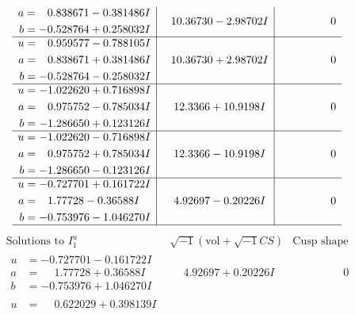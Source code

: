 \documentclass[1p]{elsarticle_modified}
\theoremstyle{definition}
\newcommand{\I}{\sqrt{-1}}
\begin{document}
$$\begin{array}{c|c|c}
\begin{aligned}
a &= \phantom{-}0.838671 - 0.381486 I \\
b &= -0.528764 + 0.258032 I\end{aligned}
 & \phantom{-}10.36730 - 2.98702 I & \phantom{-0.000000 } 0 \\ \hline\begin{aligned}
u &= \phantom{-}0.959577 - 0.788105 I \\
a &= \phantom{-}0.838671 + 0.381486 I \\
b &= -0.528764 - 0.258032 I\end{aligned}
 & \phantom{-}10.36730 + 2.98702 I & \phantom{-0.000000 } 0 \\ \hline\begin{aligned}
u &= -1.022620 + 0.716898 I \\
a &= \phantom{-}0.975752 - 0.785034 I \\
b &= -1.286650 + 0.123126 I\end{aligned}
 & \phantom{-}12.3366 + 10.9198 I & \phantom{-0.000000 } 0 \\ \hline\begin{aligned}
u &= -1.022620 - 0.716898 I \\
a &= \phantom{-}0.975752 + 0.785034 I \\
b &= -1.286650 - 0.123126 I\end{aligned}
 & \phantom{-}12.3366 - 10.9198 I & \phantom{-0.000000 } 0 \\ \hline\begin{aligned}
u &= -0.727701 + 0.161722 I \\
a &= \phantom{-}1.77728 - 0.36588 I \\
b &= -0.753976 - 1.046270 I\end{aligned}
 & \phantom{-}4.92697 - 0.20226 I & \phantom{-0.000000 } 0\\
 \hline 
 \end{array}$$\newpage$$\begin{array}{c|c|c}  
\text{Solutions to }I^u_{1}& \I (\text{vol} + \sqrt{-1}CS) & \text{Cusp shape}\\
 \hline 
\begin{aligned}
u &= -0.727701 - 0.161722 I \\
a &= \phantom{-}1.77728 + 0.36588 I \\
b &= -0.753976 + 1.046270 I\end{aligned}
 & \phantom{-}4.92697 + 0.20226 I & \phantom{-0.000000 } 0 \\ \hline\begin{aligned}
u &= \phantom{-}0.622029 + 0.398139 I \\

\end{aligned}
\end{array}$$
\end{document}
